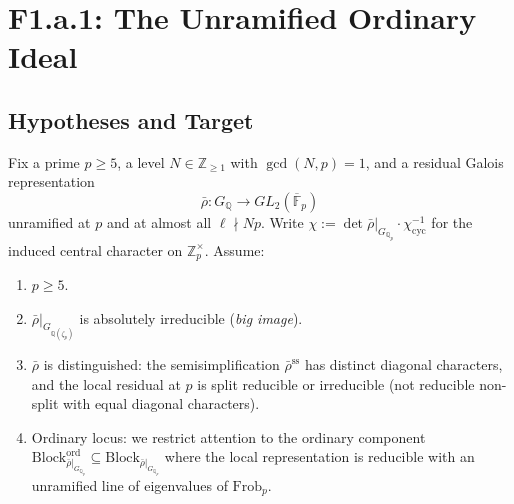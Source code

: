 \section{F1.a.1: The Unramified Ordinary Ideal}
\label{v4-arith:w5-e:f1a1}

\subsection{Hypotheses and Target}

\begin{setup}
\label{v4-arith:w5-e:setup:TW}
Fix a prime \(p\geq 5\), a level \(N\in\mathbb{Z}_{\geq 1}\) with
\(\gcd(N,p)=1\), and a residual Galois representation
\[
\bar\rho\colon G_{\mathbb{Q}}\to GL_{2}(\overline{\mathbb{F}}_{p})
\]
unramified at \(p\) and at almost all \(\ell\nmid Np\). Write
\(\chi:=\det\bar\rho|_{G_{\mathbb{Q}_{p}}}\cdot\chi_{\mathrm{cyc}}^{-1}\)
for the induced central character on \(\mathbb{Z}_{p}^{\times}\). Assume:
\begin{enumerate}
\item[\textbf{(TW1)}] \(p\geq 5\).
\item[\textbf{(TW2)}] \(\bar\rho|_{G_{\mathbb{Q}(\zeta_{p})}}\) is
absolutely irreducible (\emph{big image}).
\item[\textbf{(TW3)}] \(\bar\rho\) is distinguished: the semisimplification
\(\bar\rho^{\mathrm{ss}}\) has distinct diagonal characters, and the
local residual at \(p\) is split reducible or irreducible (not reducible
non-split with equal diagonal characters).
\item[\textbf{(TW4)}] Ordinary locus: we restrict attention to the
ordinary component
\(\mathrm{Block}^{\mathrm{ord}}_{\bar\rho|_{G_{\mathbb{Q}_{p}}}}\subseteq
\mathrm{Block}_{\bar\rho|_{G_{\mathbb{Q}_{p}}}}\) where the local
representation is reducible with an unramified line of eigenvalues
of \(\mathrm{Frob}_{p}\).
\end{enumerate}
\end{setup}

